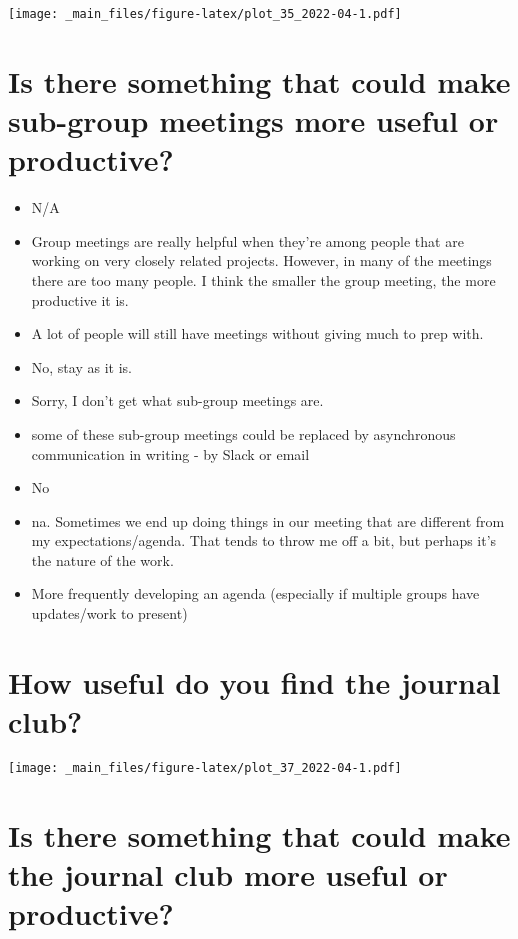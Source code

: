 \documentclass[
]{book}
\providecommand{\tightlist}{%
  \setlength{\itemsep}{0pt}\setlength{\parskip}{0pt}}
\begin{document}
\texttt{[image: \_main\_files/figure-latex/plot\_35\_2022-04-1.pdf]}

\hypertarget{is-there-something-that-could-make-sub-group-meetings-more-useful-or-productive}{%
\section{Is there something that could make sub-group meetings more useful or productive?}\label{is-there-something-that-could-make-sub-group-meetings-more-useful-or-productive}}

\begin{itemize}
\tightlist
\item
  N/A
\item
  Group meetings are really helpful when they're among people that are working on very closely related projects. However, in many of the meetings there are too many people. I think the smaller the group meeting, the more productive it is.
\item
  A lot of people will still have meetings without giving much to prep with.
\item
  No, stay as it is.
\item
  Sorry, I don't get what sub-group meetings are.
\item
  some of these sub-group meetings could be replaced by asynchronous communication in writing - by Slack or email
\item
  No
\item
  na. Sometimes we end up doing things in our meeting that are different from my expectations/agenda. That tends to throw me off a bit, but perhaps it's the nature of the work.
\item
  More frequently developing an agenda (especially if multiple groups have updates/work to present)
\end{itemize}

\hypertarget{how-useful-do-you-find-the-journal-club}{%
\section{How useful do you find the journal club?}\label{how-useful-do-you-find-the-journal-club}}

\texttt{[image: \_main\_files/figure-latex/plot\_37\_2022-04-1.pdf]}

\hypertarget{is-there-something-that-could-make-the-journal-club-more-useful-or-productive}{%
\section{Is there something that could make the journal club more useful or productive?}\label{is-there-something-that-could-make-the-journal-club-more-useful-or-productive}}
\end{document}
